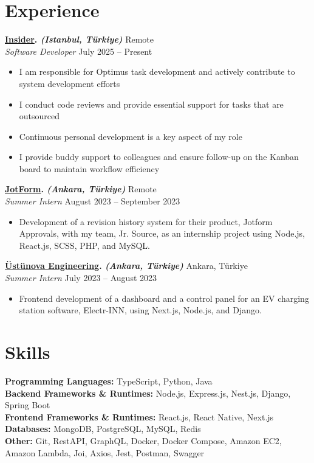 \documentclass[10pt,a4paper]{extarticle}
\begin{document}
\section{Experience}
\textbf{\href{https://useinsider.com}{Insider}. \textit{(Istanbul, Türkiye)}} \hfill Remote\\
\textit{Software Developer} \hfill July 2025 -- Present
\begin{itemize}[leftmargin=*,noitemsep,topsep=0pt]
    \item I am responsible for Optimus task development and actively contribute to system development efforts
    \item I conduct code reviews and provide essential support for tasks that are outsourced
    \item Continuous personal development is a key aspect of my role
    \item I provide buddy support to colleagues and ensure follow-up on the Kanban board to maintain workflow efficiency
\end{itemize}
\textbf{\href{https://jotform.com}{JotForm}. \textit{(Ankara, Türkiye)}} \hfill Remote\\
\textit{Summer Intern} \hfill August 2023 -- September 2023
\begin{itemize}[leftmargin=*,noitemsep,topsep=0pt]
    \item Development of a revision history system for their product, Jotform Approvals, with my team, Jr. Source, as an internship project using Node.js, React.js, SCSS, PHP, and MySQL.
\end{itemize}
\textbf{\href{https://www.ustunova.com.tr}{Üstünova Engineering}. \textit{(Ankara, Türkiye)}} \hfill Ankara, Türkiye\\
\textit{Summer Intern} \hfill July 2023 -- August 2023
\begin{itemize}[leftmargin=*,noitemsep,topsep=0pt]
    \item Frontend development of a dashboard and a control panel for an EV charging station software, Electr-INN, using Next.js, Node.js, and Django.
\end{itemize}
\section{Skills}
\textbf{Programming Languages:} TypeScript, Python, Java\\
\textbf{Backend Frameworks \& Runtimes:} Node.js, Express.js, Nest.js, Django, Spring Boot\\
\textbf{Frontend Frameworks \& Runtimes:} React.js, React Native, Next.js\\
\textbf{Databases:} MongoDB, PostgreSQL, MySQL, Redis\\
\textbf{Other:} Git, RestAPI, GraphQL, Docker, Docker Compose, Amazon EC2, Amazon Lambda, Joi, Axios, Jest, Postman, Swagger
\end{document}
